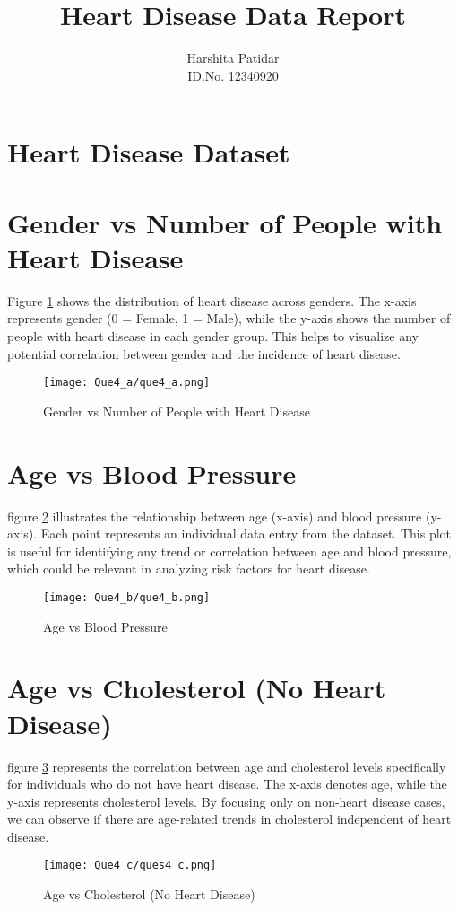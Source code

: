 \documentclass{article}
\begin{document}
	\title{Heart Disease Data Report}
	\author{Harshita Patidar \\ ID.No. 12340920} 
	
	\date{}
	\maketitle
	
	\section*{Heart Disease Dataset}

	
	\section{Gender vs Number of People with Heart Disease}
	Figure \ref{img1} shows the distribution of heart disease across genders. The x-axis represents gender (0 = Female, 1 = Male), while the y-axis shows the number of people with heart disease in each gender group. This helps to visualize any potential correlation between gender and the incidence of heart disease.
	\begin{figure}[h]
		\centering
		\texttt{[image: Que4\_a/que4\_a.png]}
		\caption{Gender vs Number of People with Heart Disease}
		\label{img1}
	\end{figure}
	\section{Age vs Blood Pressure}
	figure \ref{img2} illustrates the relationship between age (x-axis) and blood pressure (y-axis). Each point represents an individual data entry from the dataset. This plot is useful for identifying any trend or correlation between age and blood pressure, which could be relevant in analyzing risk factors for heart disease.
	\begin{figure}[h]
		\centering
		\texttt{[image: Que4\_b/que4\_b.png]}
		\caption{Age vs Blood Pressure}
		\label{img2}
	\end{figure}
	\section{Age vs Cholesterol (No Heart Disease)}
	figure \ref{img3} represents the correlation between age and cholesterol levels specifically for individuals who do not have heart disease. The x-axis denotes age, while the y-axis represents cholesterol levels. By focusing only on non-heart disease cases, we can observe if there are age-related trends in cholesterol independent of heart disease.
	\begin{figure}[h]
		\centering
		\texttt{[image: Que4\_c/ques4\_c.png]}
		\caption{Age vs Cholesterol (No Heart Disease)}
		\label{img3}
	\end{figure}
\end{document}
